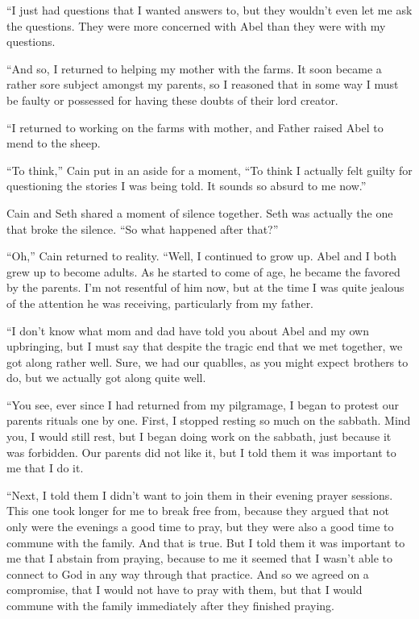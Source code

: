 \documentclass[12pt,twoside,titlepage]{report}
\begin{document}
``I just had questions that I wanted answers to, but they wouldn't even
let me ask the questions. They were more concerned with Abel than they
were with my questions.

``And so, I returned to helping my mother with the farms. It soon became
a rather sore subject amongst my parents, so I reasoned that in some way
I must be faulty or possessed for having these doubts of their lord
creator.

``I returned to working on the farms with mother, and Father raised Abel
to mend to the sheep.

``To think,'' Cain put in an aside for a moment, ``To think I actually
felt guilty for questioning the stories I was being told. It sounds so
absurd to me now.''

Cain and Seth shared a moment of silence together. Seth was actually the
one that broke the silence. ``So what happened after that?''

``Oh,'' Cain returned to reality. ``Well, I continued to grow up. Abel
and I both grew up to become adults. As he started to come of age, he
became the favored by the parents. I'm not resentful of him now, but at
the time I was quite jealous of the attention he was receiving,
particularly from my father.

``I don't know what mom and dad have told you about Abel and my own
upbringing, but I must say that despite the tragic end that we met
together, we got along rather well. Sure, we had our quablles, as you
might expect brothers to do, but we actually got along quite well.

``You see, ever since I had returned from my pilgramage, I began to
protest our parents rituals one by one. First, I stopped resting so much
on the sabbath. Mind you, I would still rest, but I began doing work on
the sabbath, just because it was forbidden. Our parents did not like it,
but I told them it was important to me that I do it.

``Next, I told them I didn't want to join them in their evening prayer
sessions. This one took longer for me to break free from, because they
argued that not only were the evenings a good time to pray, but they
were also a good time to commune with the family. And that is true. But
I told them it was important to me that I abstain from praying, because
to me it seemed that I wasn't able to connect to God in any way through
that practice. And so we agreed on a compromise, that I would not have
to pray with them, but that I would commune with the family immediately
after they finished praying.
\end{document}
